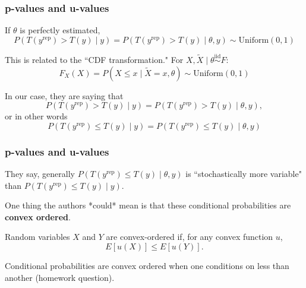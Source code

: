 \documentclass{beamer}
\begin{document}
\begin{frame}[fragile]
\frametitle{p-values and u-values}

If $\theta$ is perfectly estimated, 
$$
P(T(y^{\text{rep} } ) > T(y ) \mid y) = P(T(y^{\text{rep} } ) > T(y ) \mid \theta, y) \sim \text{Uniform}(0,1)
$$
\newline

This is related to the ``CDF transformation." For $X, \tilde{X} \mid \theta \overset{\text{iid}}{\sim} F$: 
$$
F_X(X) = P(X \le x \mid \tilde{X} = x, \theta) \sim \text{Uniform}(0,1)
$$


In our case, they are saying that 
$$
P(T(y^{\text{rep}}) > T(y) \mid y) = P(T(y^{\text{rep}}) > T(y) \mid \theta, y),
$$
or in other words
$$
P(T(y^{\text{rep}}) \le T(y) \mid y) = P(T(y^{\text{rep}}) \le T(y) \mid \theta, y) 
$$


\end{frame}

\begin{frame}[fragile]
\frametitle{p-values and u-values}

They say, generally $P(T(y^{\text{rep}}) \le T(y) \mid \theta, y)$ is ``stochastically more variable" than $P(T(y^{\text{rep}}) \le T(y) \mid y)$. 
\newline

One thing the authors *could* mean is that these conditional probabilities are {\bf convex ordered}. 
\newline


Random variables $X$ and $Y$ are convex-ordered if, for any convex function $u$, 
$$
E\left[u(X) \right] \le E\left[ u(Y) \right].
$$

Conditional probabilities are convex ordered when one conditions on less than another (homework question).

\end{frame}
\end{document}
